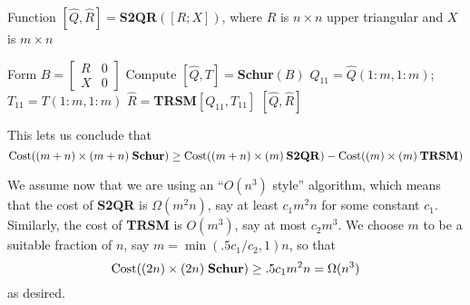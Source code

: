 \documentclass{article}
\theoremstyle{definition}
\begin{document}
\begin{algorithm}[ht!]
\protect\caption{Function $[\hat{Q}, \hat{R}] = $\textbf{S2QR}$([R; X])$, where $R$ is $n \times n$ upper triangular and $X$ is $m \times n$}%
\label{qr2schur}
\begin{algorithmic}[1]
\STATE Form $B = \left [ \begin{array}{cc} R & 0 \\ X & 0 \end{array} \right ]$
\STATE Compute $[\hat{Q}, T] = $\textbf{Schur}$(B)$
\STATE $Q_{11} = \hat{Q}(1:m, 1:m)$; $T_{11} = T(1:m, 1:m)$
\STATE $\hat{R} = $\textbf{TRSM}$[Q_{11}, T_{11}]$
\RETURN $[\hat{Q}, \hat{R}]$
\end{algorithmic}
\end{algorithm}

This lets us conclude that
\[
{\rm Cost}((m+n)\times(m+n) \; \mbox{\textbf{Schur}}) \geq
{\rm Cost}((m+n)\times(m) \: \mbox{\textbf{S2QR}}) -
{\rm Cost}((m)\times(m) \: \mbox{\textbf{TRSM}}) 
\]

We assume now that we are using an ``$O(n^3)$ style'' algorithm, which means that the cost of \textbf{S2QR}
is $\Omega (m^2 n)$, say at least $c_1 m^2 n$ for some constant $c_1$. Similarly, the cost of \textbf{TRSM} is $O(m^3)$, say at most $c_2 m^3$. We choose $m$ to be a suitable fraction of $n$, say $m = \min(.5 c_1/c_2,1)n$, so that
\[
{\rm Cost}((2n)\times(2n) \; {\rm \textbf{Schur}}) \geq .5 c_1 m^2 n = \Omega(n^3)
\]
as desired.
\end{document}

